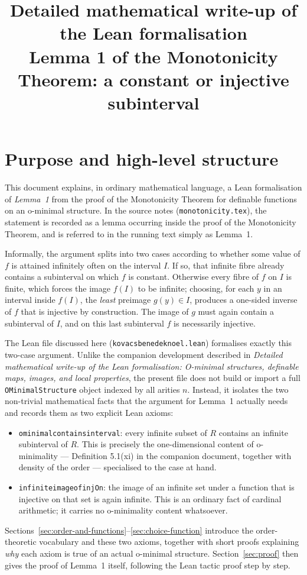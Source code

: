 \documentclass[11pt]{article}
\title{Detailed mathematical write-up of the Lean formalisation\\
Lemma 1 of the Monotonicity Theorem: a constant or injective subinterval}
\author{}
\date{}
\newcommand{\Lean}[1]{\texttt{\begingroup\def\_{\textunderscore\discretionary{}{}{}}#1\endgroup}}
\begin{document}
\maketitle
 
\section{Purpose and high-level structure}
 
This document explains, in ordinary mathematical language, a Lean formalisation of \emph{Lemma~1}
from the proof of the Monotonicity Theorem for definable functions on an o-minimal structure. In
the source notes (\Lean{monotonicity.tex}), the statement is recorded as a lemma occurring inside
the proof of the Monotonicity Theorem, and is referred to in the running text simply as Lemma~1.
 
Informally, the argument splits into two cases according to whether some value of $f$ is attained
infinitely often on the interval $I$. If so, that infinite fibre already contains a subinterval on
which $f$ is constant. Otherwise every fibre of $f$ on $I$ is finite, which forces the image
$f(I)$ to be infinite; choosing, for each $y$ in an interval inside $f(I)$, the \emph{least}
preimage $g(y)\in I$, produces a one-sided inverse of $f$ that is injective by construction. The
image of $g$ must again contain a subinterval of $I$, and on this last subinterval $f$ is
necessarily injective.
 
The Lean file discussed here (\Lean{kovacs\_benedek\_noel.lean}) formalises exactly this two-case
argument. Unlike the companion development described in \emph{Detailed mathematical write-up of
the Lean formalisation: O-minimal structures, definable maps, images, and local properties}, the
present file does not build or import a full \Lean{OMinimalStructure} object indexed by all
arities $n$. Instead, it isolates the two non-trivial mathematical facts that the argument for
Lemma~1 actually needs and records them as two explicit Lean axioms:
\begin{itemize}
  \item \Lean{o\_minimal\_contains\_interval}: every infinite subset of $R$ contains an infinite
  subinterval of $R$. This is precisely the one-dimensional content of o-minimality --- Definition
  5.1(xi) in the companion document, together with density of the order --- specialised to the
  case at hand.
  \item \Lean{infinite\_image\_of\_injOn}: the image of an infinite set under a function that is
  injective on that set is again infinite. This is an ordinary fact of cardinal arithmetic; it
  carries no o-minimality content whatsoever.
\end{itemize}
Sections~\ref{sec:order-and-functions}--\ref{sec:choice-function} introduce the order-theoretic
vocabulary and these two axioms, together with short proofs explaining \emph{why} each axiom is
true of an actual o-minimal structure. Section~\ref{sec:proof} then gives the proof of Lemma~1
itself, following the Lean tactic proof step by step.
 
\end{document}
